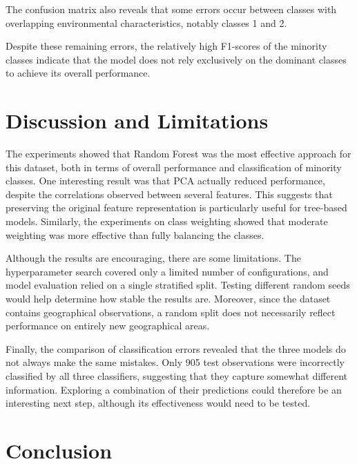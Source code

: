 \documentclass[10pt,a4paper]{article}
\begin{document}
The confusion matrix also reveals that some errors
occur between classes with overlapping environmental
characteristics, notably classes 1 and 2.

Despite these remaining errors, the relatively high
F1-scores of the minority classes indicate that
the model does not rely exclusively on the dominant
classes to achieve its overall performance.



\section{Discussion and Limitations}

The experiments showed that Random Forest was the most effective
approach for this dataset, both in terms of overall performance
and classification of minority classes. One interesting result
was that PCA actually reduced performance, despite the
correlations observed between several features. This suggests
that preserving the original feature representation is
particularly useful for tree-based models. Similarly, the
experiments on class weighting showed that moderate weighting
was more effective than fully balancing the classes.

Although the results are encouraging, there are some limitations.
The hyperparameter search covered only a limited number of
configurations, and model evaluation relied on a single
stratified split. Testing different random seeds would help
determine how stable the results are. Moreover, since the
dataset contains geographical observations, a random split
does not necessarily reflect performance on entirely new
geographical areas.

Finally, the comparison of classification errors revealed
that the three models do not always make the same mistakes.
Only 905 test observations were incorrectly classified by
all three classifiers, suggesting that they capture somewhat
different information. Exploring a combination of their
predictions could therefore be an interesting next step,
although its effectiveness would need to be tested.



\section{Conclusion}
\end{document}
